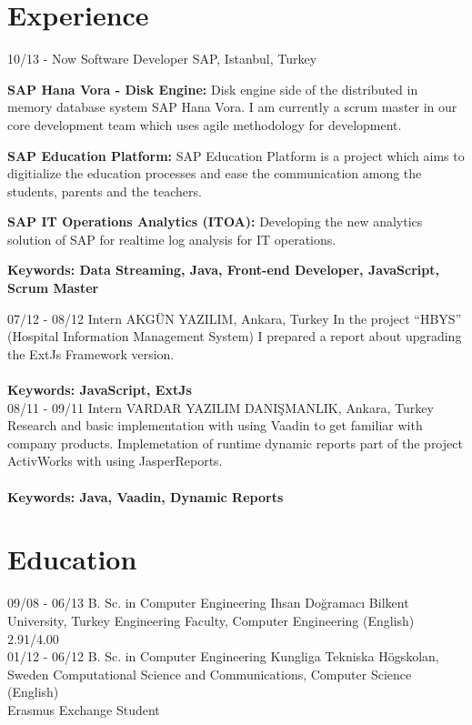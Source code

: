 \documentclass[]{friggeri-cv}
\begin{document}
\section{Experience}
\begin{entrylist}
  \entry
    {10/13 - Now}
    {Software Developer}
    {SAP, Istanbul, Turkey}
    {
     \textbf{SAP Hana Vora - Disk Engine:} Disk engine side of the distributed in memory database system SAP Hana Vora. I am currently a scrum master in our core development team which uses agile methodology for development.
    \item \textbf{SAP Education Platform:} SAP Education Platform is a project which aims to digitialize the education processes and ease the communication among the students, parents and the teachers.
    \item \textbf{SAP IT Operations Analytics (ITOA):} Developing the new analytics solution of SAP for realtime log analysis for IT operations.\\
    \item \textbf{Keywords: Data Streaming, Java, Front-end Developer, JavaScript, Scrum Master\\}
    }
  \entry
    {07/12 - 08/12 }
    {Intern}
    {AKGÜN YAZILIM, Ankara, Turkey}
    {In the project “HBYS” (Hospital Information Management System) I prepared a report about upgrading the ExtJs Framework version.\\\\
    \textbf{Keywords: JavaScript, ExtJs\\}}
    \entry
    {08/11 - 09/11}
    {Intern}
    {VARDAR YAZILIM DANIŞMANLIK, Ankara, Turkey}
    {Research and basic implementation with using Vaadin to get familiar with company products. Implemetation of runtime dynamic reports part of the project ActivWorks with using JasperReports.\\\\
    \textbf{Keywords: Java, Vaadin, Dynamic Reports\\}
    }
\end{entrylist}

\section{Education}
\begin{entrylist}
  \entry
    {09/08 - 06/13}
    {B. Sc. in Computer Engineering}
    {Ihsan Doğramacı Bilkent University, Turkey}
    {Engineering Faculty, Computer Engineering (English)\\
    2.91/4.00 \\}
    \entry
    {01/12 - 06/12}
    {B. Sc. in Computer Engineering}
    {Kungliga Tekniska Högskolan, Sweden }
    {Computational Science and Communications, Computer Science (English)\\
    Erasmus Exchange Student \\}

\end{entrylist}
\end{document}
